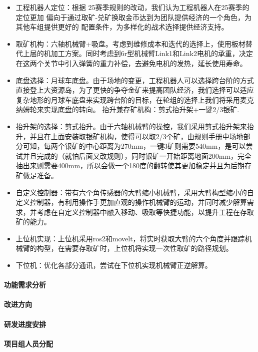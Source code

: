         \begin{itemize}
            \item 工程机器人定位：根据 25赛季规则的改动，我们认为工程机器人在25赛季的定位更加 偏向于通过取矿-兑矿换取金币达到为团队提供经济的一个角色，为其他车组提供更好的 配置条件，为多样化的战术选择提供经济支持。
            \item 取矿机构：六轴机械臂+吸盘。考虑到维修成本和迭代的选择上，使用板材替代上届的机加工方案。同时考虑到6r型机械臂Link1和Link2电机的承重，决定在这两个关节中引入弹簧的重力补偿，去避免电机的发热，延长使用寿命。
            \item 底盘选择：月球车底盘。由于场地的变更，工程机器人可以选择跨台阶的方式直接登上大资源岛，为了更快的争夺金矿来提高团队经济，我们选择可以适应复杂地形的月球车底盘来实现跨台阶的目标，在轮组的选择上我们将采用麦克纳姆轮来实现底盘的转向。 抬升兼存矿机构：剪式抬升架+一键2/3银矿.
            \item 抬升架的选择：剪式抬升。由于六轴机械臂的操控，我们采用剪式抬升架来抬升，并且在上面安装取银矿机构，使得可以取2/3个矿，由规则手册中场地部分可知，每两个银矿的中心距离为270mm，一键3矿则需要540mm，是可以尝试并且完成的（就怕后面又改规则），同时银矿一开始距离地面200mm，完全抽出来则需要400mm，所以会做一个180度的翻转使其更加稳定并且为后期存矿做足准备。
            \item 自定义控制器：带有六个角传感器的大臂缩小机械臂，采用大臂构型缩小的自定义控制器，有利用操作手更加直观的操作机械臂的运动，并同时减少解算需求，并考虑在自定义控制器中融入移动、吸取等快捷功能，以提升工程在存取矿的能力。
            \item 上位机实现：上位机采用ros2和movelt，将实时获取大臂的六个角度并跟踪机械臂的构型，在需要存取矿时，上位机将实现一次性取矿的路径规划。
            \item 下位机：优化各部分通讯，尝试在下位机实现机械臂正逆解算。
        \end{itemize}
    
    \paragraph{功能需求分析}

    
    \paragraph{改进方向}


    \paragraph{研发进度安排}


    \paragraph{项目组人员分配}

    